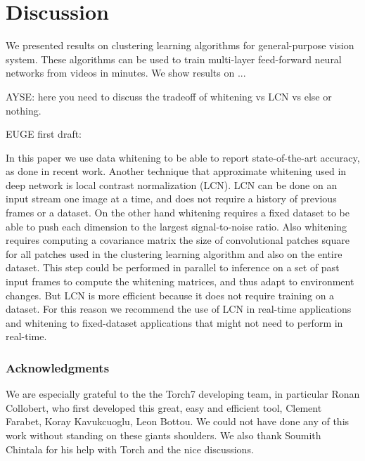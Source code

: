 \documentclass{article} %
\begin{document}
\section{Discussion}
\label{sec-disc}

We presented results on clustering learning algorithms for general-purpose vision system. These algorithms can be used to train multi-layer feed-forward neural networks from videos in minutes. We show results on ...

AYSE: here you need to discuss the tradeoff of whitening vs LCN vs else or nothing.

EUGE first draft:

In this paper we use data whitening to be able to report state-of-the-art accuracy, as done in recent work\cite{coates_analysis_2011,coates_analysis_2011,coates2012emergence,coates2012learning}. Another technique that approximate whitening used in deep network is local contrast normalization (LCN). LCN can be done on an input stream one image at a time, and does not require a history of previous frames or a dataset. On the other hand whitening requires a fixed dataset to be able to push each dimension to the largest signal-to-noise ratio. Also whitening requires computing a covariance matrix the size of convolutional patches square for all patches used in the clustering learning algorithm and also on the entire dataset. This step could be performed in parallel to inference on a set of past input frames to compute the whitening matrices, and thus adapt to environment changes. But LCN is more efficient because it does not require training on a dataset. For this reason we recommend the use of LCN in real-time applications and whitening to fixed-dataset applications that might not need to perform in real-time.


%


\subsubsection*{Acknowledgments}
We are especially grateful to the the Torch7 developing team, in particular Ronan Collobert, who first developed this great, easy and efficient tool, Clement Farabet, Koray Kavukcuoglu, Leon Bottou. We could not have done any of this work without standing on these giants shoulders. We also thank Soumith Chintala for his help with Torch and the nice discussions.



\end{document}
